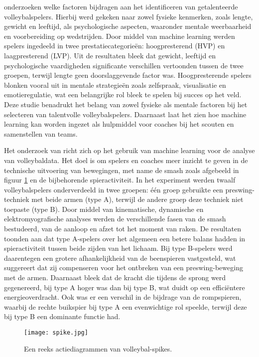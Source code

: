 \textcite{Musa2021} onderzoeken welke factoren bijdragen aan het identificeren van getalenteerde volleybalspelers. Hierbij werd gekeken naar zowel fysieke kenmerken, zoals lengte, gewicht en leeftijd, als psychologische aspecten, waaronder mentale weerbaarheid en voorbereiding op wedstrijden. Door middel van machine learning werden spelers ingedeeld in twee prestatiecategorieën: hoogpresterend (HVP) en laagpresterend (LVP).
Uit de resultaten bleek dat gewicht, leeftijd en psychologische vaardigheden significante verschillen vertoonden tussen de twee groepen, terwijl lengte geen doorslaggevende factor was. Hoogpresterende spelers blonken vooral uit in mentale strategieën zoals zelfspraak, visualisatie en emotieregulatie, wat een belangrijke rol bleek te spelen bij succes op het veld.
Deze studie benadrukt het belang van zowel fysieke als mentale factoren bij het selecteren van talentvolle volleybalspelers. Daarnaast laat het zien hoe machine learning kan worden ingezet als hulpmiddel voor coaches bij het scouten en samenstellen van teams.

Het onderzoek van \textcite{Dai2021} richt zich op het gebruik van machine learning voor de analyse van volleybaldata. Het doel is om spelers en coaches meer inzicht te geven in de technische uitvoering van bewegingen, met name de smash zoals afgebeeld in figuur \ref{fig:spike} en de bijbehorende spieractiviteit. In het experiment werden twaalf volleybalspelers onderverdeeld in twee groepen: één groep gebruikte een preswing-techniek met beide armen (type A), terwijl de andere groep deze techniek niet toepaste (type B).
Door middel van kinematische, dynamische en elektromyografische analyses werden de verschillende fasen van de smash bestudeerd, van de aanloop en afzet tot het moment van raken. De resultaten toonden aan dat type A-spelers over het algemeen een betere balans hadden in spieractiviteit tussen beide zijden van het lichaam. Bij type B-spelers werd daarentegen een grotere afhankelijkheid van de beenspieren vastgesteld, wat suggereert dat zij compenseren voor het ontbreken van een preswing-beweging met de armen.
Daarnaast bleek dat de kracht die tijdens de sprong werd gegenereerd, bij type A hoger was dan bij type B, wat duidt op een efficiëntere energieoverdracht. Ook was er een verschil in de bijdrage van de rompspieren, waarbij de rechte buikspier bij type A een evenwichtige rol speelde, terwijl deze bij type B een dominante functie had.

\begin{figure}
  \centering
  \texttt{[image: spike.jpg]}
  \caption{\label{fig:spike}Een reeks actiediagrammen van volleybal-spikes.}
  \autocite{Dai2021}
\end{figure}

